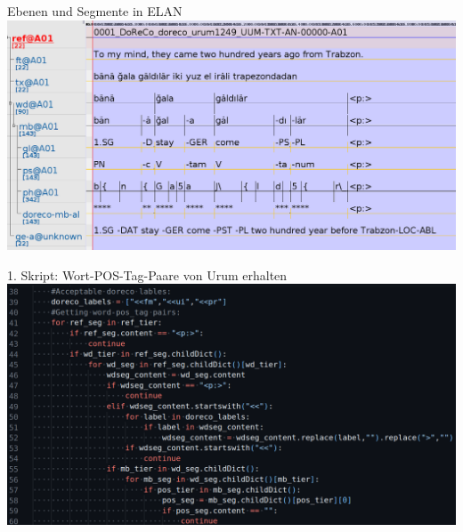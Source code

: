 \documentclass{beamer}
\begin{document}
\begin{frame}[t]{Ebenen und Segmente in ELAN}
\includegraphics[scale=0.45]{./pics/urum_doreco_elan_example.png}
\end{frame}

\begin{frame}[t]{1. Skript: Wort-POS-Tag-Paare von Urum erhalten}
	\includegraphics[scale=0.45]{"./pics/get_urum_script_pics/03.png"}
\end{frame}
\end{document}
